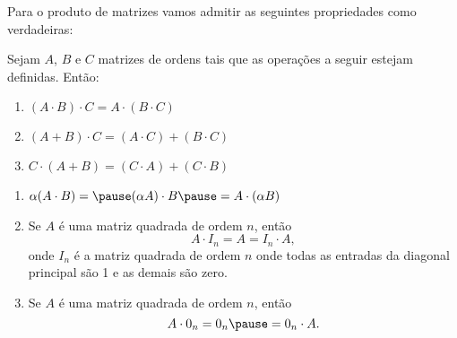 \documentclass{beamer}
\begin{document}
    \begin{frame}
        Para o produto de matrizes vamos admitir as seguintes propriedades como verdadeiras:\pause
        \begin{proposicao}
	    Sejam $A$, $B$ e $C$ \pause matrizes de ordens tais que as operações a seguir estejam definidas. Ent\~ao:\pause
            \begin{enumerate}[label={\roman*})]
                \item $(A\cdot B)\cdot C = A\cdot(B \cdot C)$\pause
                \item $(A + B)\cdot C = (A\cdot C) + (B\cdot C)$\pause
                \item $C\cdot(A + B) = (C\cdot A) + (C\cdot B)$
                \seti
            \end{enumerate}
        \end{proposicao}
    \end{frame}

    \begin{frame}
        \begin{proposicao}
            \begin{enumerate}[label={\roman*})]
                \conti
                \item $\alpha(A\cdot B) = \pause (\alpha A)\cdot B \pause = A \cdot(\alpha B)$\pause
                \item Se $A$ é uma matriz quadrada de ordem $n$, \pause então \[A\cdot I_n = A = I_n\cdot A,\] \pause onde $I_n$ é a matriz quadrada de ordem $n$ \pause onde todas as entradas da diagonal principal são 1 \pause e as demais são zero.\pause
                \item Se $A$ é uma matriz quadrada de ordem $n$, \pause então \[A\cdot0_n = 0_n \pause = 0_n\cdot A.\]
	    \end{enumerate}
        \end{proposicao}
    \end{frame}
\end{document}
